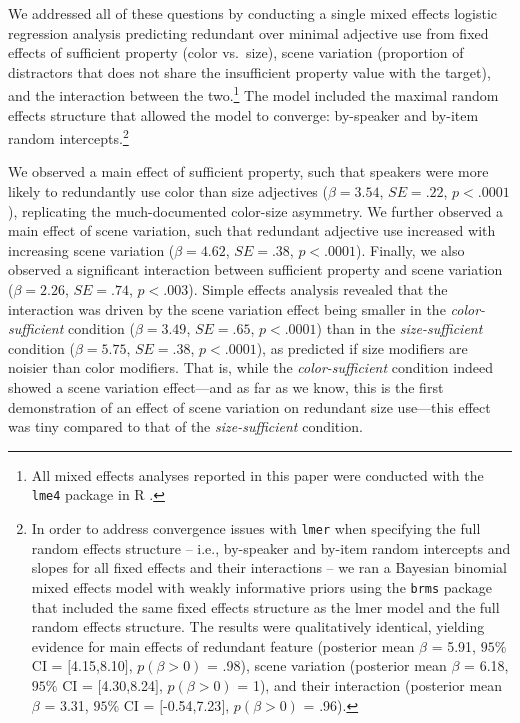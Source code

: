 \documentclass[11pt]{article}
\newcommand{\jd}[1]{\textcolor{Red}{[jd: #1]}}
\newcommand{\ndg}[1]{\textcolor{Green}{[ndg: #1]}}
\begin{document}
We addressed all of these questions by conducting a single mixed effects logistic regression analysis predicting redundant over minimal adjective use from fixed effects of sufficient property (color vs.~size), scene variation (proportion of distractors that does not share the insufficient property value with the target), and the interaction between the two.\footnote{All mixed effects analyses reported in this paper were conducted with the \verb+lme4+ package \cite{lme4} in R \cite{R}.} The model included the maximal random effects structure that allowed the model to converge: by-speaker and by-item random intercepts.\footnote{In order to address convergence issues with \verb+lmer+ when specifying the full random effects structure -- i.e., by-speaker and by-item random intercepts and slopes for all fixed effects and their interactions -- we ran a Bayesian binomial mixed effects model with weakly informative priors using the \verb+brms+ package \cite{brms} that included the same fixed effects structure as the lmer model and the full random effects structure. The results were qualitatively identical, yielding  evidence for main effects of redundant feature (posterior mean $\beta$ = 5.91, $95\%$ CI = $[$4.15,8.10$]$, $p(\beta > 0)$ = .98), scene variation (posterior mean $\beta$ = 6.18, $95\%$ CI = $[$4.30,8.24$]$, $p(\beta > 0)$ = 1), and their interaction (posterior mean $\beta$ = 3.31, $95\%$ CI = $[$-0.54,7.23$]$, $p(\beta > 0)$ = .96).}

We observed a main effect of sufficient property, such that speakers were more likely to redundantly use color than size adjectives ($\beta = 3.54$, $SE = .22$, $p < .0001$), replicating the much-documented color-size asymmetry. We further observed a main effect of scene variation, such that redundant adjective use increased with increasing scene variation ($\beta = 4.62$, $SE = .38$, $p < .0001$). Finally, we also observed a significant interaction between sufficient property and scene variation ($\beta = 2.26$, $SE = .74$, $p < .003$). Simple effects analysis revealed that the interaction was driven by the scene variation effect being smaller in the \emph{color-sufficient} condition ($\beta = 3.49$, $SE = .65$, $p < .0001$) than in the \emph{size-sufficient} condition ($\beta = 5.75$, $SE = .38$, $p < .0001$), as predicted if size modifiers are noisier than color modifiers. That is, while the \emph{color-sufficient} condition indeed showed a scene variation effect---and as far as we know, this is the first demonstration of an effect of scene variation on redundant size use---this effect was tiny compared to that of the \emph{size-sufficient} condition.
\end{document}
